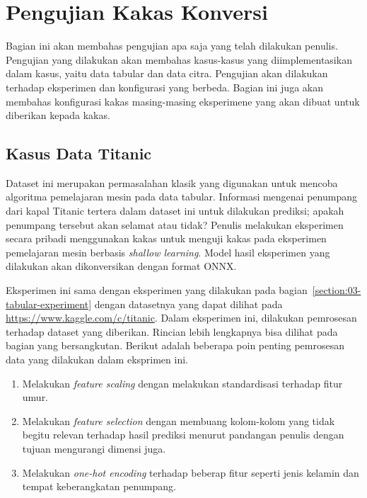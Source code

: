 
\section{Pengujian Kakas Konversi}

Bagian ini akan membahas pengujian apa saja yang telah dilakukan penulis.
Pengujian yang dilakukan akan membahas kasus-kasus yang diimplementasikan dalam kasus, yaitu data tabular dan data citra.
Pengujian akan dilakukan terhadap eksperimen dan konfigurasi yang berbeda.
Bagian ini juga akan membahas konfigurasi kakas masing-masing eksperimene yang akan dibuat untuk diberikan kepada kakas.

\subsection{Kasus Data Titanic}

Dataset ini merupakan permasalahan klasik yang digunakan untuk mencoba algoritma pemelajaran mesin pada data tabular.
Informasi mengenai penumpang dari kapal Titanic tertera dalam dataset ini untuk dilakukan prediksi; apakah penumpang tersebut akan selamat atau tidak?
Penulis melakukan eksperimen secara pribadi menggunakan kakas  untuk menguji kakas pada eksperimen pemelajaran mesin berbasis \textit{shallow learning}.
Model hasil eksperimen yang dilakukan akan dikonversikan dengan format ONNX.\@

Eksperimen ini sama dengan eksperimen yang dilakukan pada bagian~\ref{section:03-tabular-experiment} dengan datasetnya yang dapat dilihat pada \url{https://www.kaggle.com/c/titanic}.
Dalam eksperimen ini, dilakukan pemrosesan terhadap dataset yang diberikan.
Rincian lebih lengkapnya bisa dilihat pada bagian yang bersangkutan.
Berikut adalah beberapa poin penting pemrosesan data yang dilakukan dalam eksprimen ini.

\begin{enumerate}
	\item Melakukan \textit{feature scaling} dengan melakukan standardisasi terhadap fitur umur.
	\item Melakukan \textit{feature selection} dengan membuang kolom-kolom yang tidak begitu relevan terhadap hasil prediksi menurut pandangan penulis dengan tujuan mengurangi dimensi juga.
	\item Melakukan \textit{one-hot encoding} terhadap beberap fitur seperti jenis kelamin dan tempat keberangkatan penumpang.
\end{enumerate}

